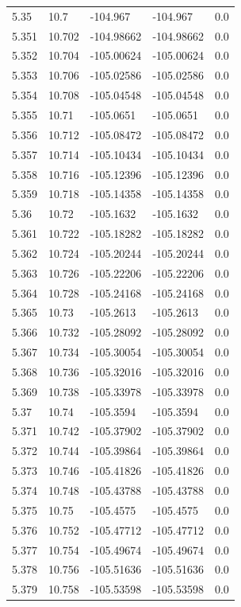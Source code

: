 \begin{tabular}{lllll}
5.35 & 10.7 & -104.967 & -104.967 & 0.0 \\
5.351 & 10.702 & -104.98662 & -104.98662 & 0.0 \\
5.352 & 10.704 & -105.00624 & -105.00624 & 0.0 \\
5.353 & 10.706 & -105.02586 & -105.02586 & 0.0 \\
5.354 & 10.708 & -105.04548 & -105.04548 & 0.0 \\
5.355 & 10.71 & -105.0651 & -105.0651 & 0.0 \\
5.356 & 10.712 & -105.08472 & -105.08472 & 0.0 \\
5.357 & 10.714 & -105.10434 & -105.10434 & 0.0 \\
5.358 & 10.716 & -105.12396 & -105.12396 & 0.0 \\
5.359 & 10.718 & -105.14358 & -105.14358 & 0.0 \\
5.36 & 10.72 & -105.1632 & -105.1632 & 0.0 \\
5.361 & 10.722 & -105.18282 & -105.18282 & 0.0 \\
5.362 & 10.724 & -105.20244 & -105.20244 & 0.0 \\
5.363 & 10.726 & -105.22206 & -105.22206 & 0.0 \\
5.364 & 10.728 & -105.24168 & -105.24168 & 0.0 \\
5.365 & 10.73 & -105.2613 & -105.2613 & 0.0 \\
5.366 & 10.732 & -105.28092 & -105.28092 & 0.0 \\
5.367 & 10.734 & -105.30054 & -105.30054 & 0.0 \\
5.368 & 10.736 & -105.32016 & -105.32016 & 0.0 \\
5.369 & 10.738 & -105.33978 & -105.33978 & 0.0 \\
5.37 & 10.74 & -105.3594 & -105.3594 & 0.0 \\
5.371 & 10.742 & -105.37902 & -105.37902 & 0.0 \\
5.372 & 10.744 & -105.39864 & -105.39864 & 0.0 \\
5.373 & 10.746 & -105.41826 & -105.41826 & 0.0 \\
5.374 & 10.748 & -105.43788 & -105.43788 & 0.0 \\
5.375 & 10.75 & -105.4575 & -105.4575 & 0.0 \\
5.376 & 10.752 & -105.47712 & -105.47712 & 0.0 \\
5.377 & 10.754 & -105.49674 & -105.49674 & 0.0 \\
5.378 & 10.756 & -105.51636 & -105.51636 & 0.0 \\
5.379 & 10.758 & -105.53598 & -105.53598 & 0.0 \\

\end{tabular}
